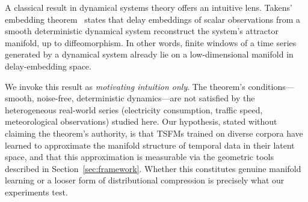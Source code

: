 A classical result in dynamical systems theory offers an intuitive lens.
Takens' embedding theorem~\cite{takens1981detecting} states that delay embeddings
of scalar observations from a smooth deterministic dynamical system reconstruct
the system's attractor manifold, up to diffeomorphism.
In other words, finite windows of a time series generated by a dynamical system
already lie on a low-dimensional manifold in delay-embedding space.

We invoke this result as \emph{motivating intuition only}.
The theorem's conditions---smooth, noise-free, deterministic dynamics---are not
satisfied by the heterogeneous real-world series (electricity consumption, traffic
speed, meteorological observations) studied here.
Our hypothesis, stated without claiming the theorem's authority, is that TSFMs
trained on diverse corpora have learned to approximate the manifold structure of
temporal data in their latent space, and that this approximation is measurable
via the geometric tools described in Section~\ref{sec:framework}.
Whether this constitutes genuine manifold learning or a looser form of
distributional compression is precisely what our experiments test.
